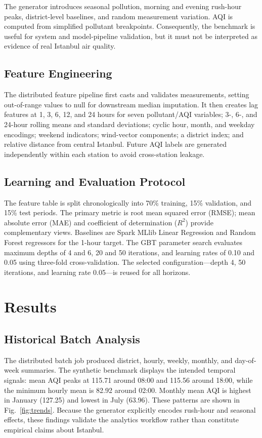 \documentclass[12pt,a4paper]{article}
\begin{document}
The generator introduces seasonal pollution, morning and evening rush-hour
peaks, district-level baselines, and random measurement variation. AQI is
computed from simplified pollutant breakpoints. Consequently, the benchmark
is useful for system and model-pipeline validation, but it must not be
interpreted as evidence of real Istanbul air quality.

\subsection{Feature Engineering}
The distributed feature pipeline first casts and validates measurements,
setting out-of-range values to null for downstream median imputation. It then
creates lag features at 1, 3, 6, 12, and 24 hours for seven pollutant/AQI
variables; 3-, 6-, and 24-hour rolling means and standard deviations; cyclic
hour, month, and weekday encodings; weekend indicators; wind-vector
components; a district index; and relative distance from central Istanbul.
Future AQI labels are generated independently within each station to avoid
cross-station leakage.

\subsection{Learning and Evaluation Protocol}
The feature table is split chronologically into 70\% training, 15\% validation,
and 15\% test periods. The primary metric is root mean squared error (RMSE);
mean absolute error (MAE) and coefficient of determination ($R^2$) provide
complementary views. Baselines are Spark MLlib Linear Regression and Random
Forest regressors for the 1-hour target. The GBT parameter search evaluates
maximum depths of 4 and 6, 20 and 50 iterations, and learning rates of 0.10 and
0.05 using three-fold cross-validation. The selected configuration---depth 4,
50 iterations, and learning rate 0.05---is reused for all horizons.

\section{Results}
\subsection{Historical Batch Analysis}
The distributed batch job produced district, hourly, weekly, monthly, and
day-of-week summaries. The synthetic benchmark displays the intended temporal
signals: mean AQI peaks at 115.71 around 08:00 and 115.56 around 18:00, while
the minimum hourly mean is 82.92 around 02:00. Monthly mean AQI is highest in
January (127.25) and lowest in July (63.96). These patterns are shown in
Fig.~\ref{fig:trends}. Because the generator explicitly encodes rush-hour and
seasonal effects, these findings validate the analytics workflow rather than
constitute empirical claims about Istanbul.
\end{document}
